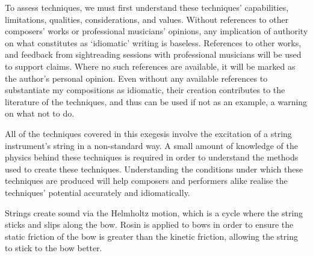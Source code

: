To assess techniques, we must first understand these techniques' capabilities, limitations, qualities, considerations, and values.
Without references to other composers' works or professional musicians' opinions, any implication of authority on what constitutes as `idiomatic' writing is baseless.  
References to other works, and feedback from sightreading sessions with professional musicians will be used to support claims.
Where no such references are available, it will be marked as the author's personal opinion. 
Even without any available references to substantiate my compositions as idiomatic, their creation contributes to the literature of the techniques, and thus can be used if not as an example, a warning on what not to do.

All of the techniques covered in this exegesis involve the excitation of a string instrument's string in a non-standard way. 
A small amount of knowledge of the physics behind these techniques is required in order to understand the methods used to create these techniques.
Understanding the conditions under which these techniques are produced will help composers and performers alike realise the techniques' potential accurately and idiomatically.

Strings create sound via the Helmholtz motion, which is a cycle where the string sticks and slips along the bow.\autocite[]{wolfeBowsStrings}
Rosin is applied to bows in order to ensure the static friction of the bow is greater than the kinetic friction, allowing the string to stick to the bow better.

